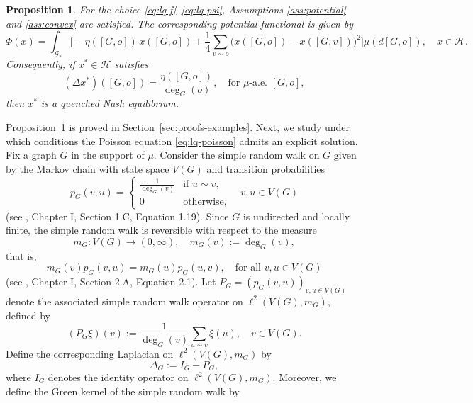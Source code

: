 \documentclass[11pt]{article}
\newcommand{\be}{\begin{equation}}
\newcommand{\ee}{\end{equation}}
\newtheorem{proposition}[theorem]{Proposition}
\numberwithin{equation}{section}
\begin{document}
\begin{proposition}\label{prop:lq-example}
For the choice \eqref{eq:lq-f}--\eqref{eq:lq-psi}, Assumptions \ref{ass:potential} and \ref{ass:convex} are satisfied. The corresponding potential functional is given by
\begin{equation}\label{eq:lq-potential}
\Phi(x)
=
\int_{\mathcal G_\ast}
\bigg[
-\eta([G,o])\,x([G,o])
+
\frac14\sum_{v\sim o}\big(x([G,o])-x([G,v])\big)^2
\bigg]\mu(d[G,o]),
\quad x\in\mathcal H.
\end{equation}
Consequently, if \(x^\ast\in\mathcal H\) satisfies
\begin{equation}\label{eq:lq-poisson}
(\Delta x^\ast)([G,o])=\frac{\eta([G,o])}{\deg_G(o)},
\quad \text{for } \mu\text{-a.e. } [G,o],
\end{equation}
then \(x^\ast\) is a quenched Nash equilibrium.
\end{proposition}
Proposition~\ref{prop:lq-example} is proved in Section~\ref{sec:proofs-examples}. Next, we study under which conditions the Poisson equation \eqref{eq:lq-poisson} admits an explicit solution. Fix a graph \(G\) in the support of \(\mu\). Consider the simple random walk on $G$ given by the Markov chain with state space $V(G)$ and transition probabilities
\be
p_G(v,u)=
\begin{cases}
    \frac{1}{\deg_G(v)} &\text{if }u\sim v,\\
    0 & \text{otherwise,}
\end{cases}
\quad v,u\in V(G)
\ee
(see \cite{woess2000random}, Chapter I, Section 1.C, Equation 1.19). Since $G$ is undirected and locally finite, the simple random walk is reversible with respect to the measure
\begin{equation}\label{eq:lq-mG}
m_G:V(G)\to(0,\infty),\quad m_G(v):=\deg_G(v),
\end{equation}
that is,
$$
m_G(v)p_G(v,u)=m_G(u)p_G(u,v),\quad\text{for all }v,u\in V(G)
$$
(see \cite{woess2000random}, Chapter I, Section 2.A, Equation 2.1). Let \(P_G=(p_G(v,u))_{v,u\in V(G)}\) denote the associated simple random walk operator on \(\ell^2(V(G),m_G)\), defined by
\begin{equation}\label{eq:lq-PG}
(P_G \xi)(v)
:=
\frac{1}{\deg_G(v)}\sum_{u\sim v}\xi(u),
\quad v\in V(G).
\end{equation}
Define the corresponding Laplacian on \(\ell^2(V(G),m_G)\) by
\begin{equation}\label{eq:lq-DeltaG}
\Delta_G:=I_G-P_G,
\end{equation}
where $I_G$ denotes the identity operator on \(\ell^2(V(G),m_G)\). Moreover, we define the Green kernel of the simple random walk by
\end{document}
